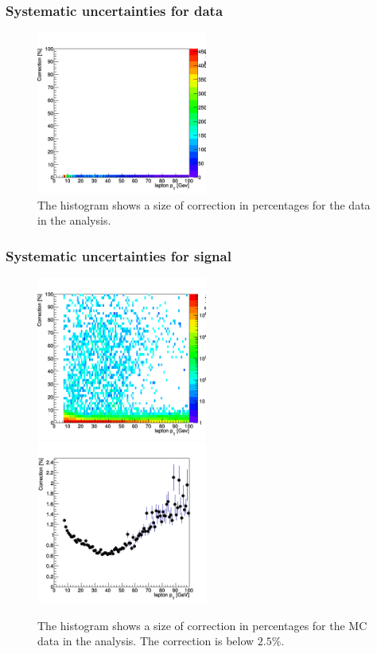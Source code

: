 \documentclass[aspectratio=1610, english]{beamer}
\begin{document}
\begin{frame}
\frametitle{Systematic uncertainties for data}

\begin{figure} [H]
\centering
\includegraphics[width=0.5\textwidth]{syst1_data.png}
\caption{The histogram shows a size of correction in percentages for the data in the analysis. }
\end{figure}

\end{frame}

\begin{frame}
\frametitle{Systematic uncertainties for signal}

\begin{figure} [H]
\centering
\includegraphics[width=0.5\textwidth]{syst1_signal.png}\hfill
\includegraphics[width=0.5\textwidth]{syst2_signal.png}
\caption{The histogram shows a size of correction in percentages for the MC data in the analysis. The correction is below $2.5\%$. }
\end{figure}

\end{frame}
\end{document}
